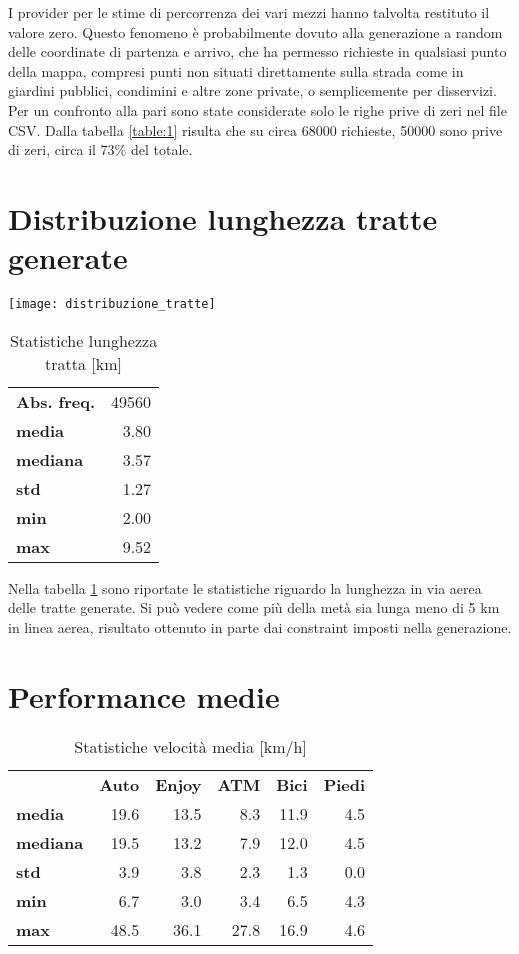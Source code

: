 I provider per le stime di percorrenza dei vari mezzi hanno talvolta restituto il valore zero. Questo fenomeno è probabilmente dovuto alla generazione a random delle coordinate di partenza e arrivo, che ha permesso richieste in qualsiasi punto della mappa, compresi punti non situati direttamente sulla strada come in giardini pubblici, condimini e altre zone private, o semplicemente per disservizi. Per un confronto alla pari sono state considerate solo le righe prive di zeri nel file CSV. Dalla tabella \ref{table:1}  risulta che su circa 68000 richieste, 50000 sono prive di zeri, circa il 73\% del totale.

\section{Distribuzione lunghezza tratte generate}

\begin{center}
\texttt{[image: distribuzione\_tratte]}
\end{center}

\begin{table}[H]
	\centering
	\begin{tabular}{ | l r | }
		\hline
		\textbf{Abs. freq.} & 49560 \\
		\textbf{media} & 3.80 \\
		\textbf{mediana} & 3.57 \\
		\textbf{std} & 1.27 \\
		\textbf{min} & 2.00 \\
		\textbf{max} & 9.52 \\
		\hline
	\end{tabular}
	\caption{Statistiche lunghezza tratta [km]}
	\label{table:2}
\end{table}

Nella tabella \ref{table:2} sono riportate le statistiche riguardo la lunghezza in via aerea delle tratte generate. Si può vedere come più della metà sia lunga meno di 5 km in linea aerea, risultato ottenuto in parte dai constraint imposti nella generazione.

\section{Performance medie}

\begin{table}[H]
	\centering
	\begin{tabular}{ | l r r r r r | }
		\hline
		& \textbf{Auto} & \textbf{Enjoy} & \textbf{ATM} & \textbf{Bici} & \textbf{Piedi} \\
		\textbf{media}   & 19.6 & 13.5 &  8.3 & 11.9 & 4.5 \\
		\textbf{mediana} & 19.5 & 13.2 &  7.9 & 12.0 & 4.5 \\
		\textbf{std}     &  3.9 &  3.8 &  2.3 &  1.3 & 0.0 \\
		\textbf{min}     &  6.7 &  3.0 &  3.4 &  6.5 & 4.3 \\
		\textbf{max}     & 48.5 & 36.1 & 27.8 & 16.9 & 4.6 \\
		\hline
	\end{tabular}
	\caption{Statistiche velocità media [km/h]}
	\label{table:3}
\end{table}

